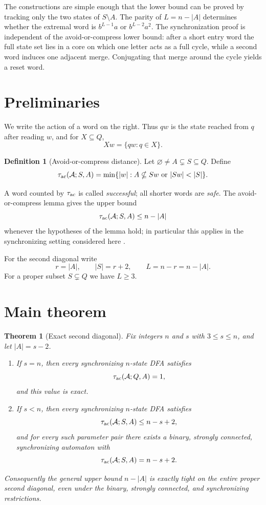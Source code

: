 \documentclass[11pt]{article}
\newtheorem{theorem}{Theorem}
\theoremstyle{definition}
\newtheorem{definition}{Definition}
\theoremstyle{remark}
\newcommand{\Acal}{\mathcal A}
\newcommand{\tauac}{\tau_{\rm ac}}
\begin{document}
The constructions are simple enough that the lower bound can be proved by tracking only the two states of $S\setminus A$. The parity of $L=n-|A|$ determines whether the extremal word is $b^{L-1}a$ or $b^{L-2}a^2$. The synchronization proof is independent of the avoid-or-compress lower bound: after a short entry word the full state set lies in a core on which one letter acts as a full cycle, while a second word induces one adjacent merge. Conjugating that merge around the cycle yields a reset word.

\section{Preliminaries}
We write the action of a word on the right. Thus $q w$ is the state reached from $q$ after reading $w$, and for $X\subseteq Q$,
\[
Xw=\{qw:q\in X\}.
\]

\begin{definition}[Avoid-or-compress distance]
Let $\varnothing\ne A\subsetneq S\subseteq Q$. Define
\[
\tauac(\Acal;S,A)=\min\{|w|: A\nsubseteq Sw\text{ or }|Sw|<|S|\}.
\]
\end{definition}

A word counted by $\tauac$ is called \emph{successful}; all shorter words are \emph{safe}. The avoid-or-compress lemma gives the upper bound
\begin{equation}\label{eq:aoc-upper}
\tauac(\Acal;S,A)\le n-|A|
\end{equation}
whenever the hypotheses of the lemma hold; in particular this applies in the synchronizing setting considered here \cite{Szykula2018,Szykula2026}.

For the second diagonal write
\[
r=|A|,\qquad |S|=r+2,\qquad L=n-r=n-|A|.
\]
For a proper subset $S\subsetneq Q$ we have $L\ge3$.

\section{Main theorem}
\begin{theorem}[Exact second diagonal]\label{thm:main}
Fix integers $n$ and $s$ with $3\le s\le n$, and let $|A|=s-2$.
\begin{enumerate}[label=(\roman*)]
\item If $s=n$, then every synchronizing $n$-state DFA satisfies
\[
\tauac(\Acal;Q,A)=1,
\]
and this value is exact.
\item If $s<n$, then every synchronizing $n$-state DFA satisfies
\[
\tauac(\Acal;S,A)\le n-s+2,
\]
and for every such parameter pair there exists a binary, strongly connected, synchronizing automaton with
\[
\tauac(\Acal;S,A)=n-s+2.
\]
\end{enumerate}
Consequently the general upper bound $n-|A|$ is exactly tight on the entire proper second diagonal, even under the binary, strongly connected, and synchronizing restrictions.
\end{theorem}
\end{document}
